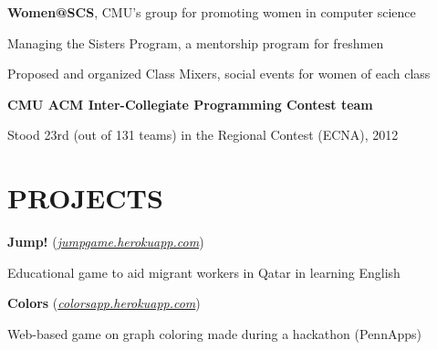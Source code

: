 \documentclass[margin, 11pt]{res} %
\begin{document}
\begin{resume}
\vspace{3pt}

{\bf Women@SCS}, CMU's group for promoting women in computer science

\begin{itemize} \itemsep -2pt
{\small \item Managing the Sisters Program, a mentorship program for freshmen
\item Proposed and organized Class Mixers, social events for women of each class}
\end{itemize}

\vspace{3pt}

{\bf CMU ACM Inter-Collegiate Programming Contest team}
\begin{itemize} \itemsep -2pt
{\small \item Stood 23rd (out of 131 teams) in the Regional Contest (ECNA), 2012}
\end{itemize}

\section{PROJECTS}

{\bf Jump!} (\href{http://jumpgame.herokuapp.com/}{\sl jumpgame.herokuapp.com})

\begin{itemize} \itemsep -2pt
{\small \item Educational game to aid migrant workers in Qatar in learning English}
\end{itemize}

\vspace{3pt}

{\bf Colors} (\href{http://colorsapp.herokuapp.com}{\sl colorsapp.herokuapp.com})
\begin{itemize} \itemsep -2pt
{\small \item Web-based game on graph coloring made during a hackathon (PennApps)}
\end{itemize}




\end{resume}
\end{document}
